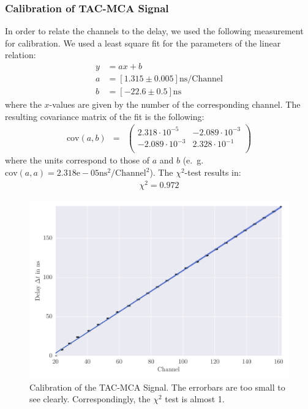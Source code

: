 \subsubsection{Calibration of TAC-MCA Signal}
\label{subs:calib_TAC}
In order to relate the channels to the delay, we used the following
measurement for calibration. We used a least square fit for the parameters
of the linear relation:
\begin{align}
    \label{eq:coeff}
    y &= ax + b \\
    a &= \left[ 1.315 \pm 0.005 \right] \mathrm{ns} / \mathrm{Channel}\\
    b &= \left[ -22.6 \pm 0.5 \right]\mathrm{ns} 
\end{align}
where the $x$-values are given by the number of the corresponding channel. 
The resulting covariance matrix of the fit is the following:
\begin{align}
    \label{eq:cov}
    \mathrm{cov}(a, b) &=& 
    \begin{pmatrix}
        2.318 \cdot 10^{-5} &-2.089\cdot 10^{-3}\\
        -2.089\cdot 10^{-3}&2.328\cdot 10^{-1}\\
    \end{pmatrix}
\end{align}
where the units correspond to those of $a$ and $b$ 
(e.~g. $\mathrm{cov}(a,a) = 2.318\mathrm{e}-05 \mathrm{ns^2} / \mathrm{Channel}^2$).
The $\chi^2$-test results in:
\begin{align}
    \label{eq:}
   \chi^2 = 0.972
\end{align}

\label{sub:calibration_of_tac_mca_signal}
\begin{figure}[htpb]
    \centering
    \includegraphics[width=0.9\linewidth]{analysis/figures/plot7}
    \caption{
        Calibration of the TAC-MCA Signal. The errorbars are too small
        to see clearly. Correspondingly, the $\chi^2$ test is almost 1.}
    \label{fig:plot7}
\end{figure}



